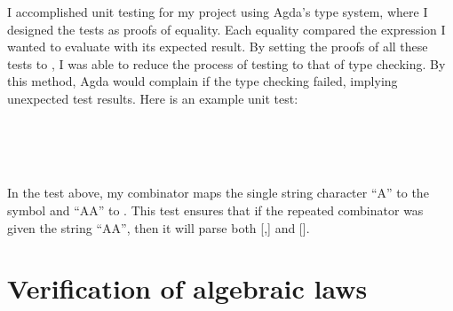 \documentclass[12pt,a4paper,twoside,openright]{report}
\newcommand{\C}{\AgdaInductiveConstructor}
\newcommand{\F}{\AgdaFunction}
\begin{document}
{I accomplished unit testing for my project using Agda's type system, where I designed the tests as proofs of equality. Each equality compared the expression I wanted to evaluate with its expected result. By setting the proofs of all these tests to \C{refl}, I was able to reduce the process of testing to that of type checking. By this method, Agda would complain if the type checking failed, implying unexpected test results. Here is an example unit test:

\begin{code}
\> \AgdaSymbol{:} \>[13] \>[17] \<[21]%
\>[21]\AgdaSymbol{=}   
\\
\>[3]\<[17]%
\>[17] \AgdaSymbol{=} \<%
\\
\>[0]\<[13]%
\>[13] \<[17]%
\>[17]    \AgdaSymbol{(}    \AgdaInductiveConstructor{[]}\AgdaSymbol{)}  \AgdaSymbol{(}  \AgdaInductiveConstructor{[]}\AgdaSymbol{)}  \AgdaInductiveConstructor{[]}\<%
\\
\> \AgdaSymbol{=} \<%
\end{code}

In the test above, my combinator \F{comb} maps the single string character ``A'' to the symbol \C{X} and ``AA'' to \C{Y}. This test ensures that if the repeated combinator was given the string ``AA'', then it will parse both [\C{X},\C{X}] and [\C{Y}].


\section{Verification of algebraic laws} \label{laws}

}
\end{document}

